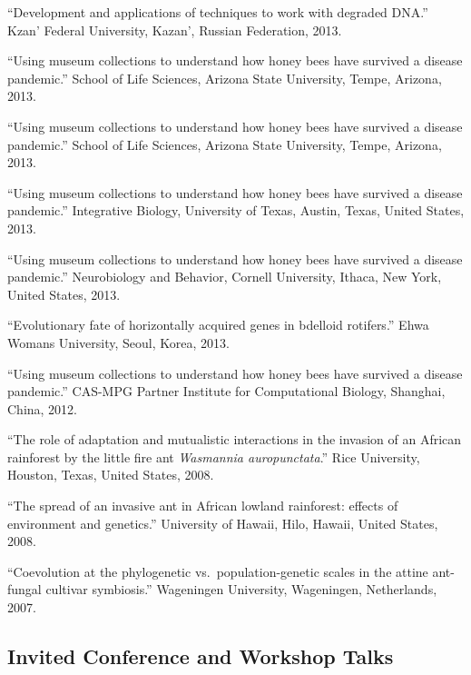 \documentclass[11pt]{article}
\def\printdate#1{\xprintdate#1-}
\def\xprintdate#1-#2-#3-{#1}
\begin{document}
\ind ``Development and applications of techniques to work with degraded
DNA.'' Kzan' Federal University, Kazan', Russian
Federation, \printdate{2013-00-00}.



\ind ``Using museum collections to understand how honey bees have
survived a disease pandemic.'' School of Life Sciences, Arizona State
University, Tempe, Arizona, \printdate{2013-00-00}.


\ind ``Using museum collections to understand how honey bees have
survived a disease pandemic.'' School of Life Sciences, Arizona State
University, Tempe, Arizona, \printdate{2013-00-00}.


\ind ``Using museum collections to understand how honey bees have
survived a disease pandemic.'' Integrative Biology, University of
Texas, Austin, Texas, United States, \printdate{2013-00-00}.


\ind ``Using museum collections to understand how honey bees have
survived a disease pandemic.'' Neurobiology and Behavior, Cornell
University, Ithaca, New York, United States, \printdate{2013-00-00}.


\ind ``Evolutionary fate of horizontally acquired genes in bdelloid
rotifers.'' Ehwa Womans University, Seoul,
Korea, \printdate{2013-00-00}.


\ind ``Using museum collections to understand how honey bees have
survived a disease pandemic.'' CAS-MPG Partner Institute for
Computational Biology, Shanghai, China, \printdate{2012-00-00}.





\ind ``The role of adaptation and mutualistic interactions in the
invasion of an African rainforest by the little fire ant
\textit{Wasmannia auropunctata}.'' Rice University, Houston, Texas,
United States, \printdate{2008-00-00}.


\ind ``The spread of an invasive ant in African lowland rainforest:
effects of environment and genetics.'' University of Hawaii, Hilo,
Hawaii, United States, \printdate{2008-00-00}.


\ind ``Coevolution at the phylogenetic vs.~population-genetic scales in
the attine ant-fungal cultivar symbiosis.'' Wageningen
University, Wageningen, Netherlands, \printdate{2007-00-00}.



\subsection{Invited Conference and Workshop Talks}
\end{document}
